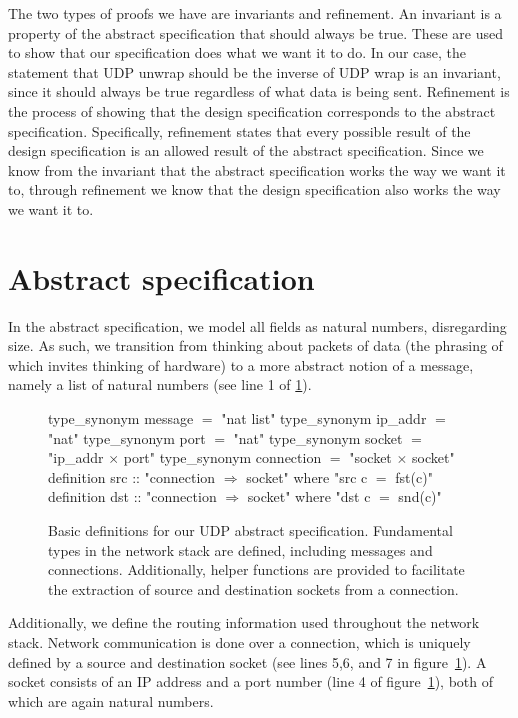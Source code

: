 \documentclass[twoside]{memoir}
\begin{document}
The two types of proofs we have are invariants and refinement.
An invariant is a property of the abstract specification that should always
be true. These are used to show that our specification does what we want it to
do. In our case, the statement that UDP unwrap should be the inverse of UDP wrap
is an invariant,
since it should always be true regardless of what data is being sent.
Refinement is the process of showing that the design specification 
corresponds to the abstract specification.
Specifically, refinement states that every possible result of the design
specification is an allowed result of the abstract specification.
Since we know from the invariant that the abstract specification 
works the way we want it to, through refinement we know
that the design specification also works the way we want it to.


\section{Abstract specification}
In the abstract specification, we model all fields as natural numbers,
disregarding size.
As such, we transition from thinking about packets of data
(the phrasing of which invites thinking of hardware)
to a more abstract notion of a message,
namely a list of natural numbers (see line 1 of \ref{fig:defs-abstract}).

\begin{figure}[htpb]
    \centering
\begin{nlisting}[language=isabelle]
type_synonym message $=$ "nat list"
type_synonym ip_addr $=$ "nat"
type_synonym port $=$ "nat"
type_synonym socket $=$ "ip_addr $\times$ port"
type_synonym connection $=$ "socket $\times$ socket"
definition src :: "connection $\Rightarrow$ socket" where "src c $=$ fst(c)"
definition dst :: "connection $\Rightarrow$ socket" where "dst c $=$ snd(c)"
\end{nlisting}
    \caption{Basic definitions for our UDP abstract specification.
        Fundamental types in the network stack are defined,
        including messages and connections.
        Additionally, helper functions are provided to facilitate 
        the extraction of source and destination sockets from a connection.}
    \label{fig:defs-abstract}
\end{figure}

Additionally, we define the routing information used throughout the
network stack.
Network communication is done over a connection,
which is uniquely defined by a source and destination socket
(see lines 5,6, and 7 in figure~\ref{fig:defs-abstract}).
A socket consists of an IP address and a port number (line 4 of figure~\ref{fig:defs-abstract}), both of which are again natural numbers.
\end{document}

